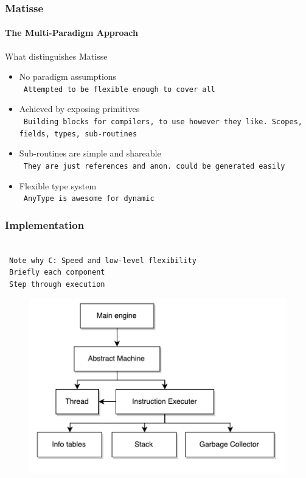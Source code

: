 \documentclass{beamer}
\newcommand{\n}[1]{\leavevmode\\~\texttt{\color{red}\tiny #1}}
\begin{document}
\begin{frame}
  \frametitle{Matisse}
  \framesubtitle{The Multi-Paradigm Approach}

  What distinguishes Matisse
  \begin{itemize}[<+->]
  \item No paradigm assumptions
    \n{Attempted to be flexible enough to cover all}
  \item Achieved by exposing primitives
    \n{Building blocks for compilers, to use however they like. Scopes, fields, types, sub-routines}
  \item Sub-routines are simple and shareable
    \n{They are just references and anon. could be generated easily}
  \item Flexible type system
    \n{AnyType is awesome for dynamic}
  \end{itemize}
\end{frame}

\begin{frame}
  \frametitle{Implementation}

  \n{Note why C: Speed and low-level flexibility}
  \n{Briefly each component}
  \n{Step through execution}

  \begin{figure}[H]
    \centering
    \includegraphics[scale=0.5]{../figures/arch.pdf}
  \end{figure}
\end{frame}
\end{document}
